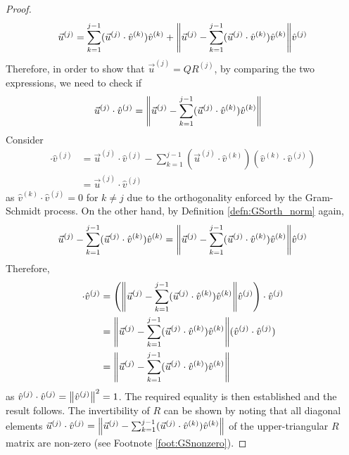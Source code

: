 \begin{proof}
\begin{align*}
\vec{u}^{(j)} = \sum_{k=1}^{j-1}(\vec{u}^{(j)} \cdot \hat{v}^{(k)})\hat{v}^{(k)} + {\norm{\vec{u}^{(j)} - \sum_{k=1}^{j-1}(\vec{u}^{(j)} \cdot \hat{v}^{(k)})\hat{v}^{(k)}}}\hat{v}^{(j)}
\end{align*}
Therefore, in order to show that $\vec{u}^{(j)} = QR^{(j)}$, by comparing the two expressions, we need to check if
\begin{align*}
\vec{u}^{(j)} \cdot \hat{v}^{(j)} &= \norm{\vec{u}^{(j)} - \sum_{k=1}^{j-1}(\vec{u}^{(j)} \cdot \hat{v}^{(k)})\hat{v}^{(k)}}
\end{align*}
Consider
\begin{align*}
[\vec{u}^{(j)} - \sum_{k=1}^{j-1}(\vec{u}^{(j)} \cdot \hat{v}^{(k)})\hat{v}^{(k)}] \cdot \hat{v}^{(j)} &= \vec{u}^{(j)} \cdot \hat{v}^{(j)} - \sum_{k=1}^{j-1}(\vec{u}^{(j)} \cdot \hat{v}^{(k)}) (\hat{v}^{(k)} \cdot \hat{v}^{(j)})\\
&= \vec{u}^{(j)} \cdot \hat{v}^{(j)}
\end{align*}
as $\hat{v}^{(k)} \cdot \hat{v}^{(j)} = 0$ for $k \neq j$ due to the orthogonality enforced by the Gram-Schmidt process. On the other hand, by Definition \ref{defn:GSorth_norm} again, 
\begin{align*}
\vec{u}^{(j)} - \sum_{k=1}^{j-1}(\vec{u}^{(j)} \cdot \hat{v}^{(k)})\hat{v}^{(k)} = \norm{\vec{u}^{(j)} - \sum_{k=1}^{j-1}(\vec{u}^{(j)} \cdot \hat{v}^{(k)})\hat{v}^{(k)}} \hat{v}^{(j)}
\end{align*}
Therefore,
\begin{align*}
[\vec{u}^{(j)} - \sum_{k=1}^{j-1}(\vec{u}^{(j)} \cdot \hat{v}^{(k)})\hat{v}^{(k)}] \cdot \hat{v}^{(j)} &= \left(\norm{\vec{u}^{(j)} - \sum_{k=1}^{j-1}(\vec{u}^{(j)} \cdot \hat{v}^{(k)})\hat{v}^{(k)}} \hat{v}^{(j)}\right) \cdot \hat{v}^{(j)} \\
&= \norm{\vec{u}^{(j)} - \sum_{k=1}^{j-1}(\vec{u}^{(j)} \cdot \hat{v}^{(k)})\hat{v}^{(k)}} (\hat{v}^{(j)} \cdot\hat{v}^{(j)}) \\
&= \norm{\vec{u}^{(j)} - \sum_{k=1}^{j-1}(\vec{u}^{(j)} \cdot \hat{v}^{(k)})\hat{v}^{(k)}}
\end{align*}
as $\hat{v}^{(j)} \cdot \hat{v}^{(j)} = \norm{\hat{v}^{(j)}}^2 = 1$. The required equality is then established and the result follows. The invertibility of $R$ can be shown by noting that all diagonal elements $\vec{u}^{(j)} \cdot \hat{v}^{(j)} = \norm{\vec{u}^{(j)} - \sum_{k=1}^{j-1}(\vec{u}^{(j)} \cdot \hat{v}^{(k)})\hat{v}^{(k)}} $ of the upper-triangular $R$ matrix are non-zero (see Footnote \ref{foot:GSnonzero}). 
\end{proof}

